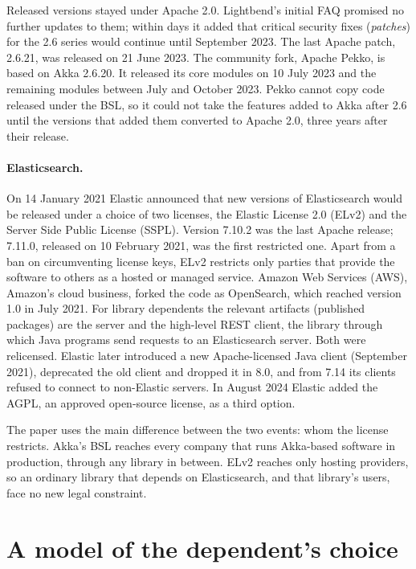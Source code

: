 \documentclass[11pt]{article}
\begin{document}
Released versions stayed under Apache 2.0. Lightbend's initial FAQ promised no further updates to them; within days it added that critical security fixes (\emph{patches}) for the 2.6 series would continue until September 2023. The last Apache patch, 2.6.21, was released on 21 June 2023. The community fork, Apache Pekko, is based on Akka 2.6.20. It released its core modules on 10 July 2023 and the remaining modules between July and October 2023. Pekko cannot copy code released under the BSL, so it could not take the features added to Akka after 2.6 until the versions that added them converted to Apache 2.0, three years after their release.

\paragraph{Elasticsearch.} On 14 January 2021 Elastic announced that new versions of Elasticsearch would be released under a choice of two licenses, the Elastic License 2.0 (ELv2) and the Server Side Public License (SSPL). Version 7.10.2 was the last Apache release; 7.11.0, released on 10 February 2021, was the first restricted one. Apart from a ban on circumventing license keys, ELv2 restricts only parties that provide the software to others as a hosted or managed service. Amazon Web Services (AWS), Amazon's cloud business, forked the code as OpenSearch, which reached version 1.0 in July 2021. For library dependents the relevant artifacts (published packages) are the server and the high-level REST client, the library through which Java programs send requests to an Elasticsearch server. Both were relicensed. Elastic later introduced a new Apache-licensed Java client (September 2021), deprecated the old client and dropped it in 8.0, and from 7.14 its clients refused to connect to non-Elastic servers. In August 2024 Elastic added the AGPL, an approved open-source license, as a third option.

The paper uses the main difference between the two events: whom the license restricts. Akka's BSL reaches every company that runs Akka-based software in production, through any library in between. ELv2 reaches only hosting providers, so an ordinary library that depends on Elasticsearch, and that library's users, face no new legal constraint.

\section{A model of the dependent's choice}\label{sec:model}
\end{document}
